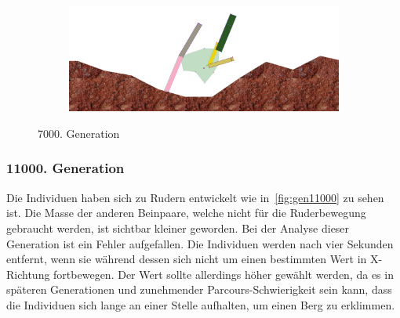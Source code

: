 \begin{figure}[H]
\begin{subfigure}[b]{0.45\textwidth}
            \includegraphics[width=\linewidth,center]{graphics/simulation-results/4_gen7000_4}
            \caption{\label{fig:gen7000_4}}
          \end{subfigure}
          \caption{7000. Generation\label{fig:gen7000}}
        \end{figure}

      \subsubsection{11000. Generation}

        Die Individuen haben sich zu Rudern entwickelt wie in~\vref{fig:gen11000} zu sehen ist.
        Die Masse der anderen Beinpaare, welche nicht für die Ruderbewegung gebraucht werden,
        ist sichtbar kleiner geworden.
        Bei der Analyse dieser Generation ist ein Fehler aufgefallen.
        Die Individuen werden nach vier Sekunden entfernt,
        wenn sie während dessen sich nicht um einen bestimmten Wert in X-Richtung fortbewegen.
        Der Wert sollte allerdings höher gewählt werden,
        da es in späteren Generationen und zunehmender Parcours-Schwierigkeit sein kann,
        dass die Individuen sich lange an einer Stelle aufhalten, um einen Berg zu erklimmen.

